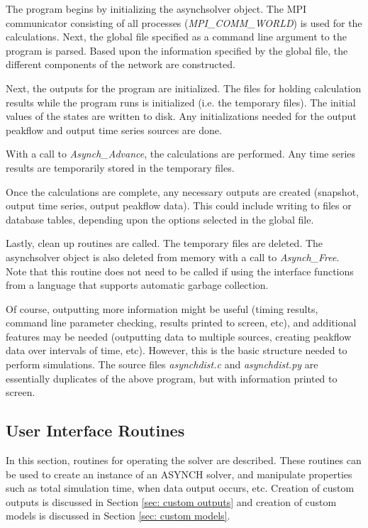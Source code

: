 \documentclass[12pt]{article}
\begin{document}
The program begins by initializing the asynchsolver object. The MPI communicator consisting of all processes (\emph{MPI\_COMM\_WORLD}) is used for the calculations. Next, the global file specified as a command line argument to the program is parsed. Based upon the information specified by the global file, the different components of the network are constructed.

Next, the outputs for the program are initialized. The files for holding calculation results while the program runs is initialized (i.e. the temporary files). The initial values of the states are written to disk. Any initializations needed for the output peakflow and output time series sources are done.

With a call to \emph{Asynch\_Advance}, the calculations are performed. Any time series results are temporarily stored in the temporary files.

Once the calculations are complete, any necessary outputs are created (snapshot, output time series, output peakflow data). This could include writing to files or database tables, depending upon the options selected in the global file.

Lastly, clean up routines are called. The temporary files are deleted. The asynchsolver object is also deleted from memory with a call to \mbox{\emph{Asynch\_Free}}. Note that this routine does not need to be called if using the interface functions from a language that supports automatic garbage collection.

Of course, outputting more information might be useful (timing results, command line parameter checking, results printed to screen, etc), and additional features may be needed (outputting data to multiple sources, creating peakflow data over intervals of time, etc). However, this is the basic structure needed to perform simulations. The source files \emph{asynchdist.c} and \emph{asynchdist.py} are essentially duplicates of the above program, but with information printed to screen.

\subsection{User Interface Routines} \label{sec: user interface routines}

In this section, routines for operating the solver are described. These routines can be used to create an instance of an ASYNCH solver, and manipulate properties such as total simulation time, when data output occurs, etc. Creation of custom outputs is discussed in Section \ref{sec: custom outputs} and creation of custom models is discussed in Section \ref{sec: custom models}.
\end{document}
